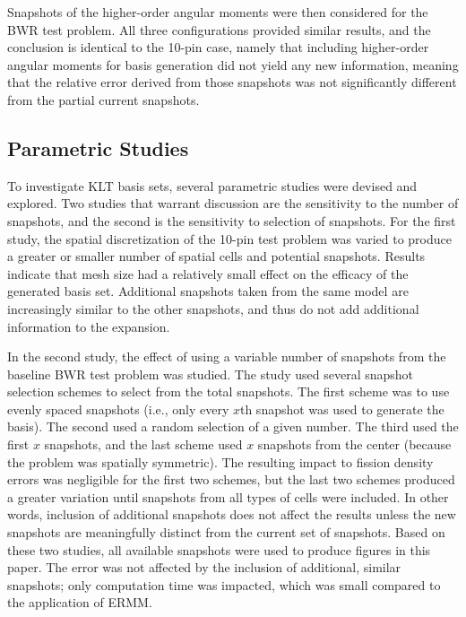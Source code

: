 \documentclass[5p,times,twocolumn,10pt]{elsarticle}
\begin{document}
    Snapshots of the higher-order angular moments were then considered for the 
    BWR test problem. All three configurations provided similar results, and 
    the conclusion is identical to the 10-pin case, namely that including 
    higher-order angular moments for basis generation did not 
    yield any new information, meaning that the relative error derived from 
    those snapshots was not significantly different from the partial current 
snapshots.

    \subsection{Parametric Studies}
  
    To investigate KLT basis sets, several parametric studies were devised and 
    explored. Two studies that warrant discussion are the sensitivity to 
    the number 
    of snapshots, and the second is the sensitivity 
    to selection of snapshots. For the first study, the spatial 
    discretization of the 10-pin test problem 
    was varied to produce a greater or smaller number of 
    spatial cells and potential snapshots. Results indicate that mesh size had 
    a relatively
    small effect on the efficacy of the generated basis set. Additional 
    snapshots taken from the same model are increasingly similar to the other 
    snapshots, and thus do not add additional information to the expansion.
    
    In the second study, the effect of using a variable number of snapshots from 
    the baseline BWR test problem was studied. The study used several snapshot 
    selection schemes to select from the total snapshots. The first scheme was 
    to use evenly spaced snapshots (i.e., only every $x$th snapshot was used to 
    generate the basis). The second used a random selection of a given number. 
    The third used
    the first $x$ snapshots, and the last scheme used $x$ snapshots from the 
    center (because the problem was spatially symmetric). The resulting impact 
    to fission density errors was negligible for the first two schemes, but the 
    last two schemes produced a greater variation until snapshots from all types 
    of cells were included. In other words, inclusion of additional snapshots 
    does not affect the results unless the new snapshots are meaningfully 
    distinct 
    from the current set of snapshots. Based on these two studies, all 
    available snapshots were used to produce figures in this paper. The error 
    was not affected by the inclusion of additional, similar snapshots; only 
    computation time was impacted, which was small compared to the application 
    of ERMM.
  
\end{document}
